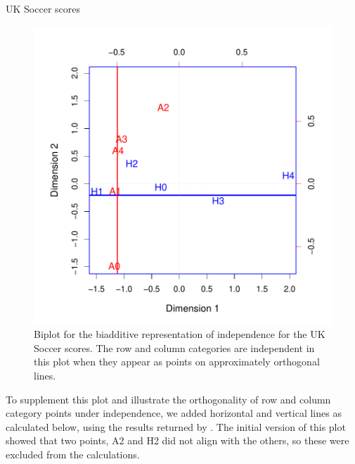 \documentclass[11pt]{book}
\renewenvironment{knitrout}{\small\renewcommand{\baselinestretch}{.85}}{} %
\begin{document}
\begin{Example}[soccer3]{UK Soccer scores}
\begin{knitrout}
\begin{figure}[!htb]
\centerline{\includegraphics[width=.7\textwidth]{ch06/fig/biplot-soccer-plot} }

\caption[Biplot for the biadditive representation of independence for the UK Soccer scores]{Biplot for the biadditive representation of independence for the UK Soccer scores. The row and column categories are independent in this plot when they appear as points on approximately orthogonal lines.\label{fig:biplot-soccer-plot}}
\end{figure}


\end{knitrout}
To supplement this plot and illustrate the orthogonality of row and column category points
under independence, we added horizontal and vertical lines as calculated below,
using the results returned by .  The initial version of this plot
showed that two points, A2 and H2 did not align with the others, so these were
excluded from the calculations.
\begin{knitrout}
\color{fgcolor}\begin{kframe}
\begin{alltt}
 \hlkwb{<-} \hlopt{$}\hlstd{x[,}\hlopt{:}\hlstd{]}
 \hlkwb{<-} \hlopt{$}\hlstd{rotation[,}\hlopt{:}\hlstd{]}
 \hlkwb{<-} \hlstd{(rscores[}\hlopt{-}\hlstd{,])[}\hlstd{]}
 \hlkwb{<-} \hlstd{(cscores[}\hlopt{-}\hlstd{,])[}\hlstd{]}


\end{alltt}
\end{kframe}
\end{knitrout}
\end{Example}
\end{document}
